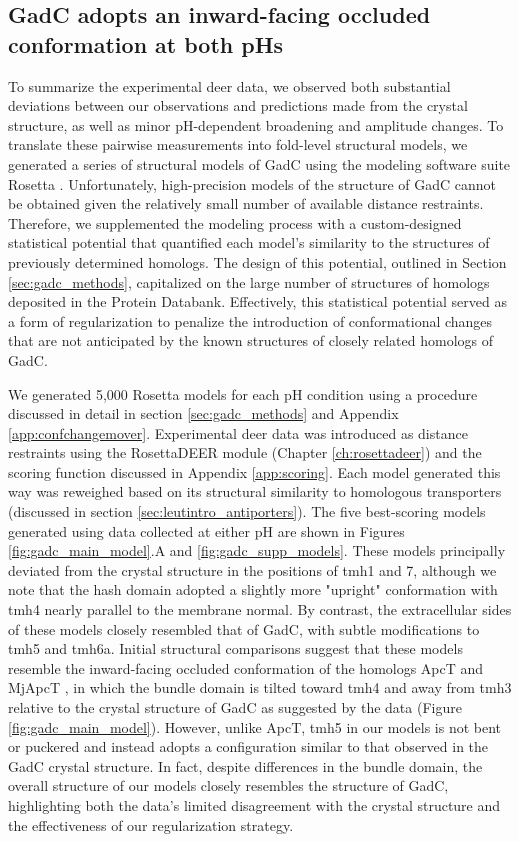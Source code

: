 \subsection{GadC adopts an inward-facing occluded conformation at both pHs}

To summarize the experimental \gls{deer} data, we observed both substantial deviations between our observations and predictions made from the crystal structure, as well as minor pH-dependent broadening and amplitude changes. To translate these pairwise measurements into fold-level structural models, we generated a series of structural models of GadC using the modeling software suite Rosetta \citep*{Leaver-fay2011, Leman2020}. Unfortunately, high-precision models of the structure of GadC cannot be obtained given the relatively small number of available distance restraints. Therefore, we supplemented the modeling process with a custom-designed statistical potential that quantified each model's similarity to the structures of previously determined homologs. The design of this potential, outlined in Section \ref{sec:gadc_methods},  capitalized on the large number of structures of homologs deposited in the Protein Databank. Effectively, this statistical potential served as a form of regularization to penalize the introduction of conformational changes that are not anticipated by the known structures of closely related homologs of GadC.

We generated 5,000 Rosetta models for each pH condition using a procedure discussed in detail in section \ref{sec:gadc_methods} and Appendix \ref{app:confchangemover}. Experimental \gls{deer} data was introduced as distance restraints using the RosettaDEER module (Chapter \ref{ch:rosettadeer}) and the scoring function discussed in Appendix \ref{app:scoring}. Each model generated this way was reweighed based on its structural similarity to homologous transporters (discussed in section \ref{sec:leutintro_antiporters}). The five best-scoring models generated using data collected at either pH are shown in Figures \ref{fig:gadc_main_model}.A and \ref{fig:gadc_supp_models}. These models principally deviated from the crystal structure in the positions of \gls{tmh}1 and 7, although we note that the hash domain adopted a slightly more "upright" conformation with \gls{tmh}4 nearly parallel to the membrane normal. By contrast, the extracellular sides of these models closely resembled that of GadC, with subtle modifications to \gls{tmh}5 and \gls{tmh}6a. Initial structural comparisons suggest that these models resemble the inward-facing occluded conformation of the homologs ApcT \citep*{Shaffer2009} and MjApcT \citep*{Jungnickel2018}, in which the bundle domain is tilted toward \gls{tmh}4 and away from \gls{tmh}3 relative to the crystal structure of GadC as suggested by the data (Figure \ref{fig:gadc_main_model}). However, unlike ApcT, \gls{tmh}5 in our models is not bent or puckered and instead adopts a configuration similar to that observed in the GadC crystal structure. In fact, despite differences in the bundle domain, the overall structure of our models closely resembles the structure of GadC, highlighting both the data's limited disagreement with the crystal structure and the effectiveness of our regularization strategy.

